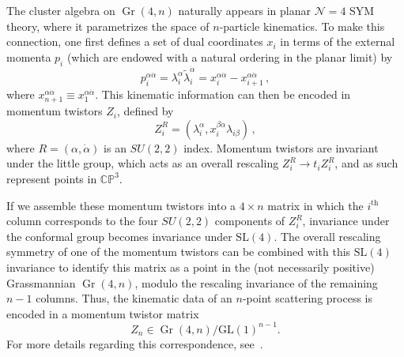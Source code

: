 \documentclass[11pt]{article}
\DeclareMathOperator{\Gr}{Gr}
\begin{document}

The cluster algebra on $\Gr(4,n)$ naturally appears in planar $\mathcal{N}=4$ SYM theory, where it parametrizes the space of $n$-particle kinematics. To make this connection, one first defines a set of dual coordinates $x_i$ in terms of the external momenta $p_i$ (which are endowed with a natural ordering in the planar limit) by
\begin{equation}
p_i^{\alpha \dot \alpha} = \lambda_i^\alpha \tilde \lambda_i^{\dot \alpha} = x_i^{\alpha \dot \alpha} - x_{i+1}^{\alpha \dot \alpha} \, , \label{eq:dual_coordiantes}
\end{equation}
where $x_{n+1}^{\alpha \dot \alpha} \equiv x_1^{\alpha \dot \alpha}$. This kinematic information can then be encoded in momentum twistors $Z_i$, defined by
\begin{equation}
Z^R_i = (\lambda_i^\alpha, x_i^{\beta \dot \alpha} \lambda_{i \beta}) \, ,
\end{equation}
where $R = (\alpha, \dot \alpha)$ is an $SU(2,2)$ index. Momentum twistors are invariant under the little group, which acts as an overall rescaling $Z_i^R \rightarrow  t_i Z_i^R$, and as such represent points in $\mathbb{CP}^3$. 

If we assemble these momentum twistors into a $4 \times n$ matrix in which the $i^\text{th}$ column corresponds to the four $SU(2,2)$ components of $Z_i^R$, invariance under the conformal group becomes invariance under $\text{SL}(4)$. The overall rescaling symmetry of one of the momentum twistors can be combined with this $\text{SL}(4)$ invariance to identify this matrix as a point in the (not necessarily positive) Grassmannian $\Gr(4,n)$, modulo the rescaling invariance of the remaining $n-1$ columns. Thus, the kinematic data of an $n$-point scattering process is encoded in a momentum twistor matrix
\begin{equation}
Z_n \in \Gr(4,n)/\text{GL}(1)^{n-1}. \label{eq:gr4n_momentum_twistor}
\end{equation}
For more details regarding this correspondence, see~\cite{ArkaniHamed:2012nw,Golden:2013xva}. 
\end{document}
